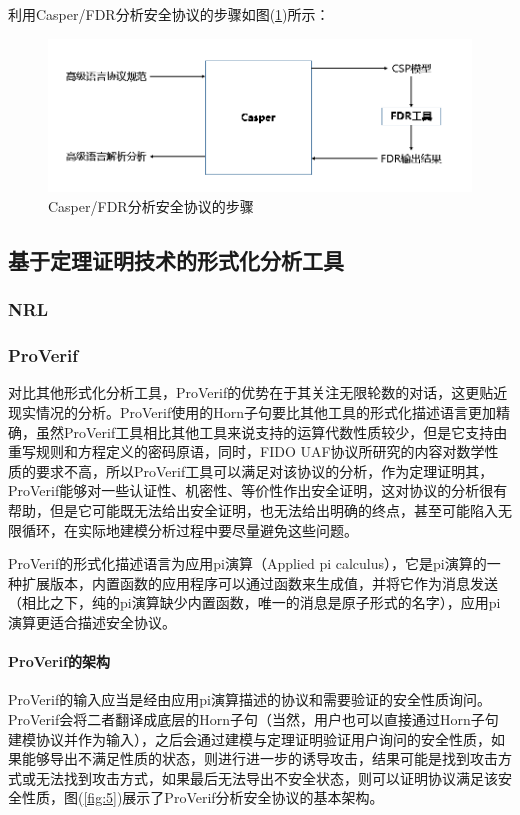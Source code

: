\documentclass[cs4size,a4pape,UTF8]{ctexart}
\numberwithin{equation}{section}
\numberwithin{table}{section}
\numberwithin{figure}{section}
\begin{document}
利用Casper/FDR分析安全协议的步骤如图(\ref{fig:4})所示：

\begin{figure}[h!]
\centering
\includegraphics[width=0.8\linewidth]{figure/4}
\caption{Casper/FDR分析安全协议的步骤\cite{1}}
\label{fig:4}
\end{figure}

\subsection{基于定理证明技术的形式化分析工具}
\subsubsection{NRL}
\subsubsection{ProVerif}
对比其他形式化分析工具，ProVerif的优势在于其关注无限轮数的对话，这更贴近现实情况的分析。ProVerif使用的Horn子句要比其他工具的形式化描述语言更加精确，虽然ProVerif工具相比其他工具来说支持的运算代数性质较少，但是它支持由重写规则和方程定义的密码原语，同时，FIDO UAF协议所研究的内容对数学性质的要求不高，所以ProVerif工具可以满足对该协议的分析，作为定理证明其，ProVerif能够对一些认证性、机密性、等价性作出安全证明，这对协议的分析很有帮助，但是它可能既无法给出安全证明，也无法给出明确的终点，甚至可能陷入无限循环，在实际地建模分析过程中要尽量避免这些问题\cite{7}。

ProVerif的形式化描述语言为应用pi演算（Applied pi calculus），它是pi演算的一种扩展版本，内置函数的应用程序可以通过函数来生成值，并将它作为消息发送（相比之下，纯的pi演算缺少内置函数，唯一的消息是原子形式的名字），应用pi演算更适合描述安全协议。

\paragraph{ProVerif的架构}

ProVerif的输入应当是经由应用pi演算描述的协议和需要验证的安全性质询问。ProVerif会将二者翻译成底层的Horn子句（当然，用户也可以直接通过Horn子句建模协议并作为输入），之后会通过建模与定理证明验证用户询问的安全性质，如果能够导出不满足性质的状态，则进行进一步的诱导攻击，结果可能是找到攻击方式或无法找到攻击方式，如果最后无法导出不安全状态，则可以证明协议满足该安全性质，图(\ref{fig:5})展示了ProVerif分析安全协议的基本架构。
\end{document}
